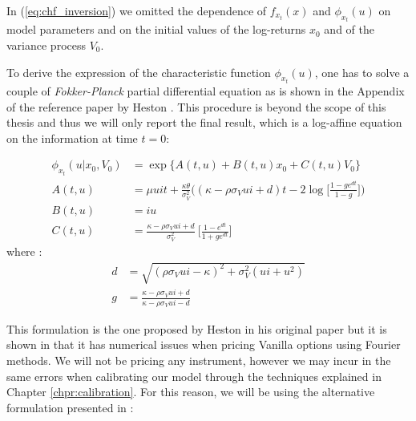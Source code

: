 In (\ref{eq:chf_inversion}) we omitted the dependence of $f_{x_t}(x)$ and $\phi_{x_t}(u)$ on model parameters and on the initial values of the log-returns $x_0$ and of the variance process $V_0$. 

\bigskip

To derive the expression of the characteristic function $\phi_{x_t}(u)$, one has to solve a couple of \textit{Fokker-Planck} partial differential equation as is shown in the Appendix of the reference paper by Heston \cite{HESTON93}. This procedure is beyond the scope of this thesis and thus we will only report the final result, which is a log-affine equation on the information at time $t = 0$:

\begin{subequations}
\begin{align}
\label{eq:heston_chf+ABC}
	\phi_{x_t}(u| x_0, V_0) &= \exp\{A(t,u) + B(t,u) x_0 + C(t,u) V_0\}\nonumber \\
	A(t,u) &= \mu u i t +  \frac{\kappa\theta}{\sigma_V^2} \bigg( (\kappa - \rho\sigma_V u i +d)t - 2 \log\Big[  \frac{1-ge^{dt}}{1-g} \Big] \bigg)\\
	B(t,u) &= i u \\
	C(t,u)&= \frac{\kappa - \rho\sigma_V u i +d}{\sigma_V^2} \:\Big[\frac{1-e^{dt}}{1+ge^{dt}}\Big]
\end{align}
\end{subequations} 
where :
\begin{equation*}
\begin{split}
d&=\sqrt{(\rho \sigma_V u i - \kappa)^2 + \sigma_V^2(u i + u^2)}\\
g&= \frac{\kappa - \rho\sigma_V u i + d}{\kappa - \rho\sigma_V u i - d}
\end{split}
\end{equation*} 



This formulation is the one proposed by Heston in his original paper \cite{HESTON93} but it is shown in \cite{HESTONTRAP}  that it has numerical issues when  pricing Vanilla options using Fourier methods. We will not be pricing any instrument, however we may incur in the same errors when calibrating our model through the techniques explained in Chapter \ref{chpr:calibration}. For this reason, we will be using the alternative formulation presented in \cite{HESTONTRAP}:




